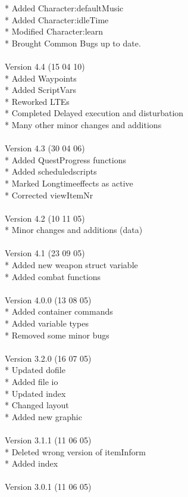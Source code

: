 \documentclass[a4paper,10pt,makeidx]{scrreprt}
\begin{document}
* Added Character:defaultMusic\\
* Added Character:idleTime\\
* Modified Character:learn\\
* Brought Common Bugs up to date.\\
\\
Version 4.4 (15 04 10)\\
* Added Waypoints\\
* Added ScriptVars\\
* Reworked LTEs\\
* Completed Delayed execution and disturbation\\
* Many other minor changes and additions\\
\\
Version 4.3 (30 04 06)\\
* Added QuestProgress functions\\
* Added scheduledscripts\\
* Marked Longtimeeffects as active\\
* Corrected viewItemNr\\
\\
Version 4.2 (10 11 05)\\
* Minor changes and additions (data)\\
\\
Version 4.1 (23 09 05)\\
* Added new weapon struct variable\\
* Added combat functions\\
\\
Version 4.0.0 (13 08 05)\\
* Added container commands\\
* Added variable types\\
* Removed some minor bugs\\
\\
Version 3.2.0 (16 07 05)\\
* Updated dofile\\
* Added file io\\
* Updated index\\
* Changed layout\\
* Added new graphic\\
\\
Version 3.1.1 (11 06 05)\\
* Deleted wrong version of itemInform\\
* Added index\\
\\
Version 3.0.1 (11 06 05)\\
\end{document}
